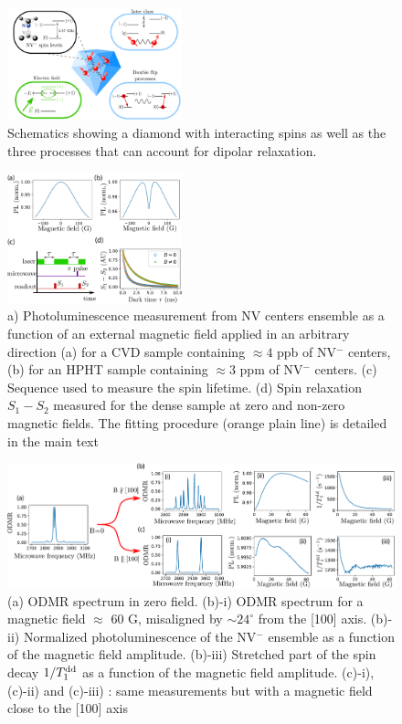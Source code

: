 \documentclass[preprintnumbers,amsmath,amssymb,superscriptaddress,twocolumn,showpacs]{revtex4-2}
\begin{document}
\begin{figure}
\includegraphics[width=0.45\textwidth]{Figures/shema_summary.pdf}
\caption{Schematics showing a diamond with interacting spins as well as the three processes that can account for dipolar relaxation. }
\label{T1}
\end{figure}

\begin{figure}
\includegraphics[width=0.45\textwidth]{Figures/fig_T1.pdf}
\caption{a) Photoluminescence measurement from NV centers ensemble as a function of an external magnetic field applied in an arbitrary direction (a) for a CVD sample containing $\approx4$ ppb of NV$^-$ centers, (b) for an HPHT sample containing $\approx3$ ppm of NV$^-$ centers. 
(c) Sequence used to measure the spin lifetime. (d) Spin relaxation $S_1-S_2$ measured for the dense sample at zero and non-zero magnetic fields. The fitting procedure (orange plain line) is detailed in the main text}
\label{T1}
\end{figure}

\begin{figure}
\includegraphics[width=.95\textwidth]{Figures/fig_100_vs_1x1x1x1.pdf}
\caption{(a) ODMR spectrum in zero field. (b)-i) ODMR spectrum for a magnetic field $\approx$ 60 G, misaligned by $\sim  24^\circ$ from the [100] axis. (b)-ii) Normalized photoluminescence of the NV$^-$ ensemble as a function of the magnetic field amplitude. (b)-iii) Stretched part of the spin decay $1/T_1^{\rm dd}$ as a function of the magnetic field amplitude. (c)-i), (c)-ii) and (c)-iii) : same measurements but with a magnetic field close to the [100] axis}
\label{100_VS_1x4}
\end{figure}
\end{document}
